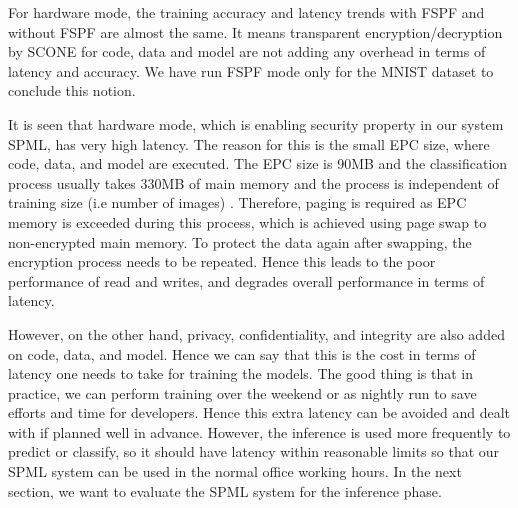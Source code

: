 For hardware mode, the training accuracy and latency trends with FSPF and without FSPF are almost the same. It means transparent encryption/decryption by SCONE for code, data and model are not adding any overhead in terms of latency and accuracy. We have run FSPF mode only for the MNIST dataset to conclude this notion.

It is seen that hardware mode, which is enabling security property in our system SPML, has very high latency. The reason for this is the small EPC size, where code, data, and model are executed. The EPC size is 90MB and the classification process usually takes 330MB of main memory and the process is independent of training size (i.e number of images) \cite{81}. Therefore, paging is required as EPC memory is exceeded during this process, which is achieved using page swap to non-encrypted main memory. To protect the data again after swapping, the encryption process needs to be repeated. Hence this leads to the poor performance of read and writes, and degrades overall performance in terms of latency.

However, on the other hand, privacy, confidentiality, and integrity are also added on code, data, and model. Hence we can say that this is the cost in terms of latency one needs to take for training the models. The good thing is that in practice, we can perform training over the weekend or as nightly run to save efforts and time for developers. Hence this extra latency can be avoided and dealt with if planned well in advance. However, the inference is used more frequently to predict or classify, so it should have latency within reasonable limits so that our SPML system can be used in the normal office working hours. In the next section, we want to evaluate the SPML system for the inference phase.
